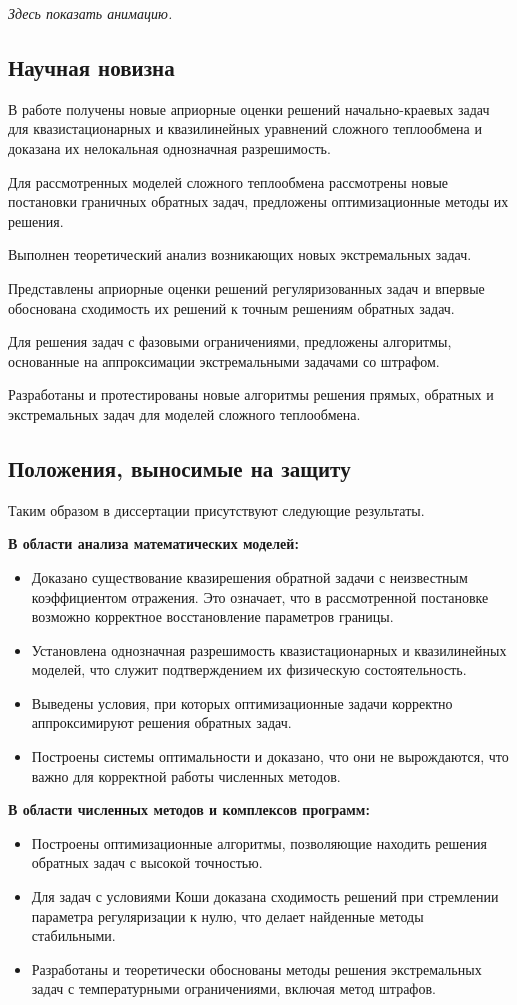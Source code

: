 \documentclass[8pt,a4paper]{article}
\begin{document}
    \textit{Здесь показать анимацию.}
    \subsection*{Научная новизна}
    В работе получены новые априорные оценки решений
    начально-краевых задач для квазистационарных и квазилинейных
    уравнений сложного теплообмена и доказана их нелокальная
    однозначная разрешимость.

    Для рассмотренных моделей сложного теплообмена
    рассмотрены новые постановки граничных обратных задач,
    предложены оптимизационные методы их решения.

    Выполнен теоретический анализ возникающих новых экстремальных задач.

    Представлены априорные оценки решений регуляризованных задач и впервые
    обоснована сходимость их решений к точным решениям обратных задач.

    Для решения задач с фазовыми ограничениями, предложены алгоритмы,
    основанные на аппроксимации экстремальными задачами со штрафом.

    Разработаны и протестированы новые алгоритмы решения прямых,
    обратных и экстремальных задач для моделей сложного теплообмена.


    \subsection*{Положения, выносимые на защиту}
    Таким образом в диссертации присутствуют следующие результаты.

    \textbf{В области анализа математических моделей:}
    \begin{itemize}
        \item Доказано существование квазирешения обратной задачи с неизвестным коэффициентом отражения. Это означает, что в рассмотренной постановке возможно корректное восстановление параметров границы.
        \item Установлена однозначная разрешимость квазистационарных и квазилинейных моделей, что служит подтверждением их физическую состоятельность.
        \item Выведены условия, при которых оптимизационные задачи корректно аппроксимируют решения обратных задач.
        \item Построены системы оптимальности и доказано, что они не вырождаются, что важно для корректной работы численных методов.
    \end{itemize}

    \textbf{В области численных методов и комплексов программ:}
    \begin{itemize}
        \item Построены оптимизационные алгоритмы, позволяющие находить решения обратных задач с высокой точностью.
        \item Для задач с условиями Коши доказана сходимость решений при стремлении параметра регуляризации к нулю, что делает найденные методы стабильными.
        \item Разработаны и теоретически обоснованы методы решения экстремальных задач с температурными ограничениями,
        включая метод штрафов.
    \end{itemize}
\end{document}
